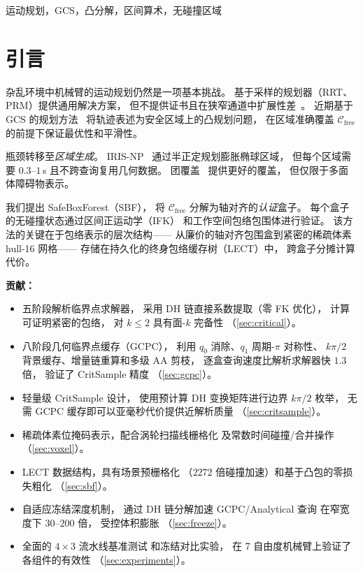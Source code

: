 \documentclass[journal]{IEEEtran}
\newcommand{\Cfree}{\mathcal{C}_\text{free}}
\begin{document}
\begin{IEEEkeywords}
运动规划，GCS，凸分解，区间算术，无碰撞区域
\end{IEEEkeywords}

\section{引言}\label{sec:intro}

杂乱环境中机械臂的运动规划仍然是一项基本挑战。
基于采样的规划器（RRT、PRM）提供通用解决方案，
但不提供证书且在狭窄通道中扩展性差~\cite{lavalle2006planning}。
近期基于 GCS 的规划方法~\cite{marcucci2024motion}
将轨迹表述为安全区域上的凸规划问题，
在区域准确覆盖 $\Cfree$ 的前提下保证最优性和平滑性。

瓶颈转移至\emph{区域生成}。
IRIS-NP~\cite{werner2024fast} 通过半正定规划膨胀椭球区域，
但每个区域需要 $0.3$--$1$\,s 且不跨查询复用几何数据。
团覆盖~\cite{amice2024clique} 提供更好的覆盖，
但仅限于多面体障碍物表示。

我们提出 SafeBoxForest（SBF），
将 $\Cfree$ 分解为轴对齐的\emph{认证}盒子。
每个盒子的无碰撞状态通过区间正运动学（IFK）
和工作空间包络包围体进行验证。
该方法的关键在于包络表示的层次结构——
从廉价的轴对齐包围盒到紧密的稀疏体素 hull-16 网格——
存储在持久化的终身包络缓存树（LECT）中，
跨盒子分摊计算代价。

\textbf{贡献：}
\begin{itemize}
  \item 五阶段解析临界点求解器，
    采用 DH 链直接系数提取（零 FK 优化），
    计算可证明紧密的包络，
    对 $k \leq 2$ 具有面-$k$ 完备性
    （\cref{sec:critical}）。
  \item 八阶段几何临界点缓存（GCPC），
    利用 $q_0$ 消除、$q_1$ 周期-$\pi$ 对称性、
    $k\pi/2$ 背景缓存、增量链重算和多级 AA 剪枝，
    逐盒查询速度比解析求解器快 $1.3$ 倍，
    验证了 CritSample 精度
    （\cref{sec:gcpc}）。
  \item 轻量级 CritSample 设计，
    使用预计算 DH 变换矩阵进行边界 $k\pi/2$ 枚举，
    无需 GCPC 缓存即可以亚毫秒代价提供近解析质量
    （\cref{sec:critsample}）。
  \item 稀疏体素位掩码表示，配合涡轮扫描线栅格化
    及常数时间碰撞/合并操作
    （\cref{sec:voxel}）。
  \item LECT 数据结构，具有场景预栅格化
    （$2272$ 倍碰撞加速）和基于凸包的零损失粗化
    （\cref{sec:sbf}）。
  \item 自适应冻结深度机制，
    通过 DH 链分解加速 GCPC/Analytical 查询
    在窄宽度下 $30$--$200$ 倍，
    受控体积膨胀
    （\cref{sec:freeze}）。
  \item 全面的 $4{\times}3$ 流水线基准测试
    和冻结对比实验，
    在 7 自由度机械臂上验证了各组件的有效性
    （\cref{sec:experiments}）。
\end{itemize}
\end{document}
